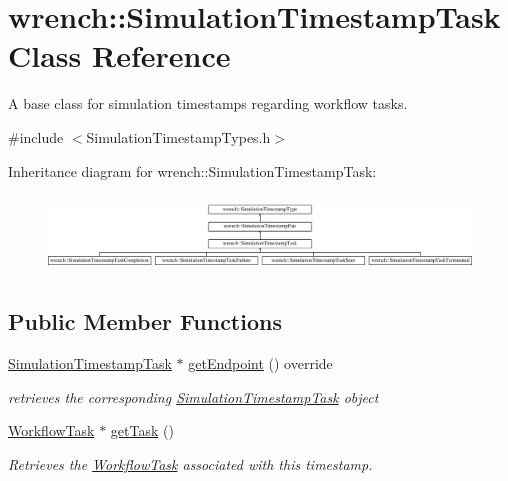 \hypertarget{classwrench_1_1_simulation_timestamp_task}{}\section{wrench\+:\+:Simulation\+Timestamp\+Task Class Reference}
\label{classwrench_1_1_simulation_timestamp_task}


A base class for simulation timestamps regarding workflow tasks.  




{\ttfamily \#include $<$Simulation\+Timestamp\+Types.\+h$>$}

Inheritance diagram for wrench\+:\+:Simulation\+Timestamp\+Task\+:\begin{figure}[H]
\begin{center}
\leavevmode
\includegraphics[height=2.066421cm]{classwrench_1_1_simulation_timestamp_task}
\end{center}
\end{figure}
\subsection*{Public Member Functions}
\begin{DoxyCompactItemize}
\item 
\hyperlink{classwrench_1_1_simulation_timestamp_task}{Simulation\+Timestamp\+Task} $\ast$ \hyperlink{classwrench_1_1_simulation_timestamp_task_af8e8da0d1710e20f4e517852c53cb1f2}{get\+Endpoint} () override
\begin{DoxyCompactList}\small\item\em retrieves the corresponding \hyperlink{classwrench_1_1_simulation_timestamp_task}{Simulation\+Timestamp\+Task} object \end{DoxyCompactList}\item 
\hyperlink{classwrench_1_1_workflow_task}{Workflow\+Task} $\ast$ \hyperlink{classwrench_1_1_simulation_timestamp_task_a9a9440d71940fccf0fb33383ce056a37}{get\+Task} ()
\begin{DoxyCompactList}\small\item\em Retrieves the \hyperlink{classwrench_1_1_workflow_task}{Workflow\+Task} associated with this timestamp. \end{DoxyCompactList}\end{DoxyCompactItemize}
